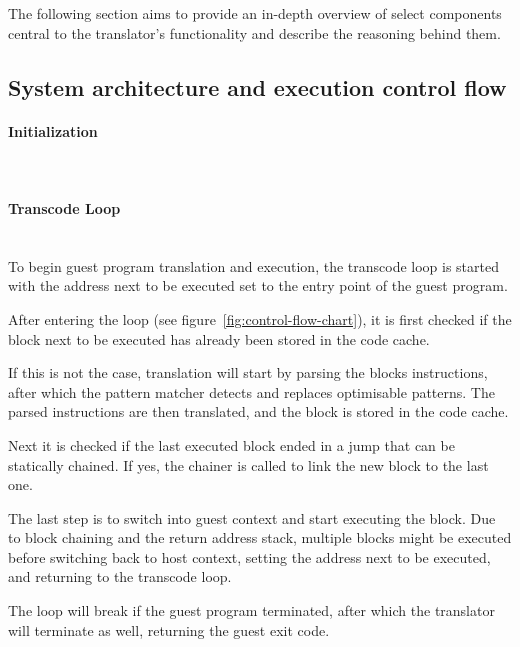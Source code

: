 The following section aims to provide an in-depth overview of select components central to the translator's functionality and describe the reasoning behind them. %

\subsection{System architecture and execution control flow}
\paragraph{Initialization}\mbox{}\\

\paragraph{Transcode Loop}\mbox{}\\
To begin guest program translation and execution, the transcode loop is started with the address next to be executed set to the entry point of the guest program.

After entering the loop (see figure~\ref{fig:control-flow-chart}), it is first checked if the block next to be executed has already been stored in the code cache.

If this is not the case, translation will start by parsing the blocks instructions, after which the pattern matcher detects and replaces optimisable patterns.
The parsed instructions are then translated, and the block is stored in the code cache.

Next it is checked if the last executed block ended in a jump that can be statically chained.
If yes, the chainer is called to link the new block to the last one.

The last step is to switch into guest context and start executing the block.
Due to block chaining and the return address stack, multiple blocks might be executed before switching back to host context, setting the address next to be executed, and returning to the transcode loop.

The loop will break if the guest program terminated, after which the translator will terminate as well, returning the guest exit code.


